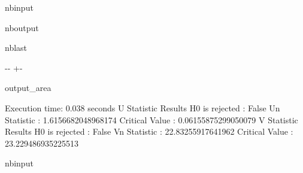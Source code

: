 \documentclass[letterpaper,10pt,english,openany,oneside]{sphinxmanual}
\begin{document}
{{{{\begin{sphinxuseclass}{nbinput}
{\begin{sphinxVerbatim}[commandchars=\\\{\}]
\end{sphinxVerbatim}
}

\end{sphinxuseclass}
\begin{sphinxuseclass}{nboutput}
\begin{sphinxuseclass}{nblast}
{

\kern-\sphinxverbatimsmallskipamount\kern-\baselineskip
\kern+\FrameHeightAdjust\kern-\fboxrule
\vspace{\nbsphinxcodecellspacing}

\begin{sphinxuseclass}{output_area}
\begin{sphinxuseclass}{}


\begin{sphinxVerbatim}[commandchars=\\\{\}]
Execution time: 0.038 seconds
U Statistic Results
H0 is rejected : False
Un Statistic : 1.6156682048968174
Critical Value : 0.06155875299050079
V Statistic Results
H0 is rejected : False
Vn Statistic : 22.83255917641962
Critical Value : 23.229486935225513
\end{sphinxVerbatim}



\end{sphinxuseclass}
\end{sphinxuseclass}
}

\end{sphinxuseclass}
\end{sphinxuseclass}
\begin{sphinxuseclass}{nbinput}
{
\begin{sphinxVerbatim}[commandchars=\\\{\}]
\llap{\color{nbsphinxin}[12]:\,\hspace{\fboxrule}\hspace{\fboxsep}}
\end{sphinxVerbatim}
}


\end{sphinxuseclass}}}}}
\end{document}
